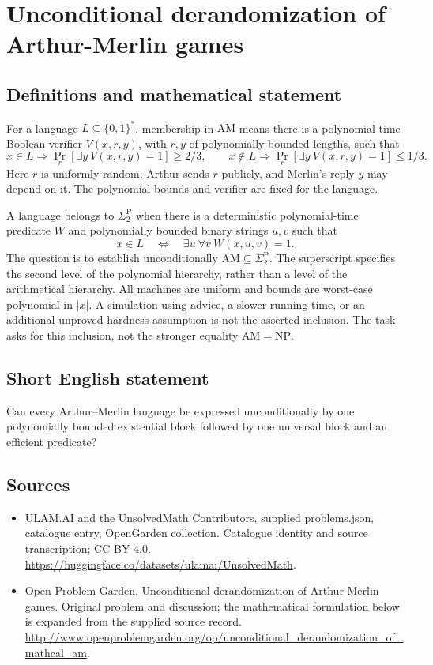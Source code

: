 \documentclass[11pt,a4paper]{article}
\begin{document}
\section*{Unconditional derandomization of Arthur-Merlin games}\label{statement}

\subsection{Definitions and mathematical statement}
For a language $L\subseteq\{0,1\}^*$, membership in $\mathrm{AM}$
means there is a polynomial-time Boolean verifier $V(x,r,y)$,
with $r,y$ of polynomially bounded lengths, such that
\[
 x\in L\Rightarrow\Pr_r[\exists y\ V(x,r,y)=1]\ge2/3,
 \qquad
 x\notin L\Rightarrow\Pr_r[\exists y\ V(x,r,y)=1]\le1/3.
\]
Here $r$ is uniformly random; Arthur sends $r$ publicly, and Merlin's
reply $y$ may depend on it. The polynomial bounds and verifier are
fixed for the language.

A language belongs to $\Sigma_2^{\mathrm P}$ when there is a
deterministic polynomial-time predicate $W$ and polynomially bounded
binary strings $u,v$ such that
\[
             x\in L\quad\Longleftrightarrow\quad
                         \exists u\ \forall v\ W(x,u,v)=1.
\]
The question is to establish unconditionally
$\mathrm{AM}\subseteq\Sigma_2^{\mathrm P}$.
The superscript specifies the second level of the polynomial
hierarchy, rather than a level of the arithmetical hierarchy.
All machines are uniform and bounds are worst-case polynomial in
$|x|$. A simulation using advice, a slower running time, or an
additional unproved hardness assumption is not the asserted inclusion.
The task asks for this inclusion, not the stronger equality
$\mathrm{AM}=\mathrm{NP}$.
\subsection{Short English statement}
Can every Arthur–Merlin language be expressed unconditionally by one polynomially bounded existential block followed by one universal block and an efficient predicate?
\subsection{Sources}
\begin{itemize}
\item[S1] ULAM.AI and the UnsolvedMath Contributors, supplied problems.json, catalogue entry, OpenGarden collection. Catalogue identity and source transcription; CC BY 4.0.
\url{https://huggingface.co/datasets/ulamai/UnsolvedMath}.
\item[S2] Open Problem Garden, Unconditional derandomization of Arthur-Merlin games. Original problem and discussion; the mathematical formulation below is expanded from the supplied source record.
\url{http://www.openproblemgarden.org/op/unconditional_derandomization_of_mathcal_am}.
\end{itemize}
\end{document}
